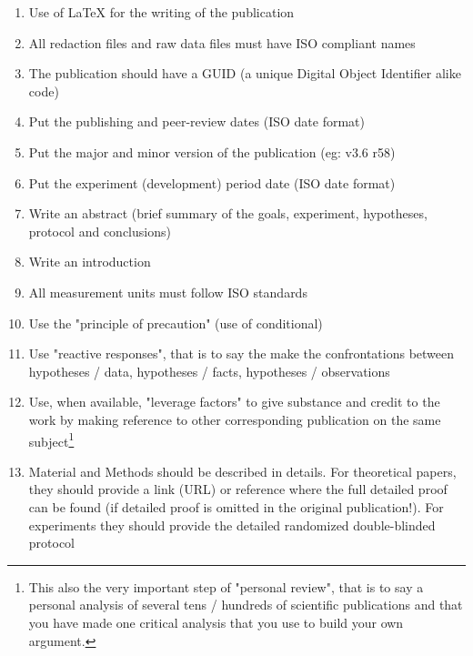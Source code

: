 	\begin{enumerate}
		\item Use of LaTeX for the writing of the publication
		
		\item All redaction files and raw data files must have ISO compliant names
		
		\item The publication should have a GUID (a unique Digital Object Identifier alike code)
		
		\item Put the publishing and peer-review dates (ISO date format)
		
		\item Put the major and minor version of the publication (eg: v3.6 r58)
		
		\item Put the experiment (development) period date (ISO date format)
		
		\item Write an abstract (brief summary of the goals, experiment, hypotheses, protocol and conclusions)
		
		\item Write an introduction

		\item All measurement units must follow ISO standards
		
		\item Use the "principle of precaution" (use of conditional)
		
		\item Use "reactive responses", that is to say the make the confrontations between hypotheses / data, hypotheses / facts, hypotheses / observations 
		
		\item Use, when available, "leverage factors" to give substance and credit to the work by making reference to other corresponding publication on the same subject\footnote{This also the very important step of "personal review", that is to say a personal analysis of several tens / hundreds of scientific publications and that you have made one critical analysis that you use to build your own argument.}
		
		\item Material and Methods should be described in details. For theoretical papers, they should provide a link (URL) or reference where the full detailed proof can be found (if detailed proof is omitted in the original publication!). For experiments they should provide the detailed randomized double-blinded protocol
		

\end{enumerate}
